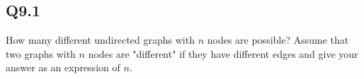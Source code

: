 \documentclass{article}
\begin{document}
\subsection*{Q9.1}
How many different undirected graphs with $n$ nodes are possible? Assume that two graphs with $n$ nodes are "different" if they have different edges and give your answer as an expression of $n$.
\newpage
\end{document}
